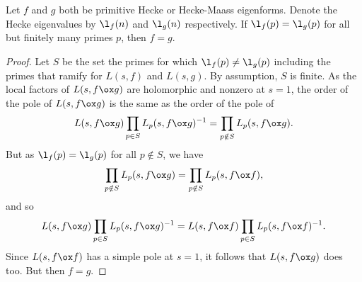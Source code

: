      \begin{theorem}
        Let $f$ and $g$ both be primitive Hecke or Hecke-Maass eigenforms. Denote the Hecke eigenvalues by $\l_{f}(n)$ and $\l_{g}(n)$ respectively. If $\l_{f}(p) = \l_{g}(p)$ for all but finitely many primes $p$, then $f = g$.
      \end{theorem}
      \begin{proof}
        Let $S$ be the set the primes for which $\l_{f}(p) \neq \l_{g}(p)$ including the primes that ramify for $L(s,f)$ and $L(s,g)$. By assumption, $S$ is finite. As the local factors of $L(s,f \ox g)$ are holomorphic and nonzero at $s = 1$, the order of the pole of $L(s,f \ox g)$ is the same as the order of the pole of
        \[
          L(s,f \ox g)\prod_{p \in S}L_{p}(s,f \ox g)^{-1} = \prod_{p \notin S}L_{p}(s,f \ox g).
        \]
        But as $\l_{f}(p) = \l_{g}(p)$ for all $p \notin S$, we have
        \[
          \prod_{p \notin S}L_{p}(s,f \ox g) = \prod_{p \notin S}L_{p}(s,f \ox f),
        \]
        and so
        \[
          L(s,f \ox g)\prod_{p \in S}L_{p}(s,f \ox g)^{-1} = L(s,f \ox f)\prod_{p \in S}L_{p}(s,f \ox f)^{-1}.
        \]
        Since $L(s,f \ox f)$ has a simple pole at $s = 1$, it follows that $L(s,f \ox g)$ does too. But then $f = g$.
      \end{proof}
